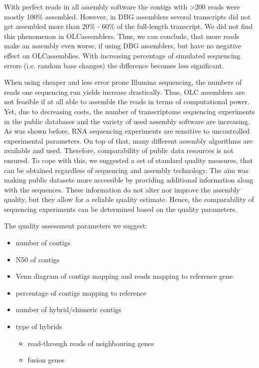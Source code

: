 	With perfect reads in all assembly software the contigs with >200 reads were mostly 100\% assembled.
	However, in \ac{DBG} assemblers several transcripts did not get assembled more than 20\% - 60\% of the full-length transcript.
	We did not find this phenomenon in \ac{OLC}assemblers.
	Thus, we can conclude, that more reads make an assembly even worse, if using \ac{DBG} assemblers, but have no negative effect on \ac{OLC}assemblies.
	With increasing percentage of simulated sequencing errors (i.e. random base changes) the difference becomes less significant.
	
	When using cheaper and less error prone Illumina sequencing, the numbers of reads one sequencing run yields increase drastically.
	Thus, \ac{OLC} assemblers are not feasible if at all able to assemble the reads in terms of computational power.
	Yet, due to decreasing costs, the number of transcriptome sequencing experiments in the public databases and the variety of used assembly software are increasing.
	As was shown before, RNA sequencing experiments are sensitive to uncontrolled experimental parameters.
	On top of that, many different assembly algorithms are available and used.
	Therefore, comparability of public data resources is not ensured.
	To cope with this, we suggested a set of standard quality measures, that can be obtained regardless of sequencing and assembly technology.
	The aim was making public datasets more accessible by providing additional information along with the sequences.
	These information do not alter nor improve the assembly quality, but they allow for a reliable quality estimate.
	Hence, the comparability of sequencing experiments can be determined based on the quality parameters.
	
	The quality assessment parameters we suggest:
		
		\begin{itemize}
			\item number of contigs
			\item N50 of contigs
			\item Venn diagram of contigs mapping and reads mapping to reference gene
			\item percentage of contigs mapping to reference
			\item number of hybrid/chimeric contigs
			\item type of hybrids
			\begin{itemize}
				\item read-through reads of neighbouring genes
				\item fusion genes
			\end{itemize}
		\end{itemize}
		
